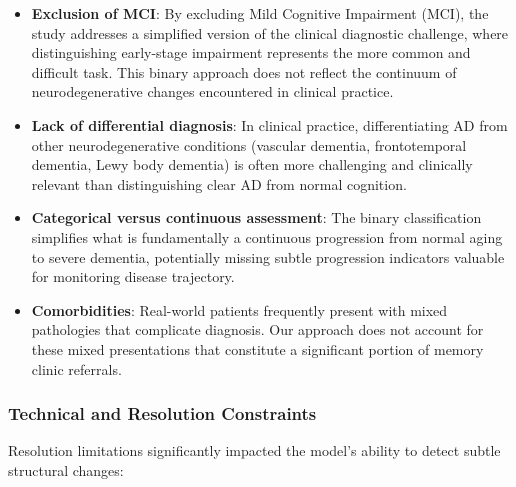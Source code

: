 \documentclass[12pt, a4paper]{article}
\begin{document}
\begin{itemize}
    \item \textbf{Exclusion of MCI}: By excluding Mild Cognitive Impairment (MCI), the study addresses a simplified version of the clinical diagnostic challenge, where distinguishing early-stage impairment represents the more common and difficult task. This binary approach does not reflect the continuum of neurodegenerative changes encountered in clinical practice.
    
    \item \textbf{Lack of differential diagnosis}: In clinical practice, differentiating AD from other neurodegenerative conditions (vascular dementia, frontotemporal dementia, Lewy body dementia) is often more challenging and clinically relevant than distinguishing clear AD from normal cognition.
    
    \item \textbf{Categorical versus continuous assessment}: The binary classification simplifies what is fundamentally a continuous progression from normal aging to severe dementia, potentially missing subtle progression indicators valuable for monitoring disease trajectory.
    
    \item \textbf{Comorbidities}: Real-world patients frequently present with mixed pathologies that complicate diagnosis. Our approach does not account for these mixed presentations that constitute a significant portion of memory clinic referrals.
\end{itemize}

\subsubsection{Technical and Resolution Constraints}

Resolution limitations significantly impacted the model's ability to detect subtle structural changes:
\end{document}
